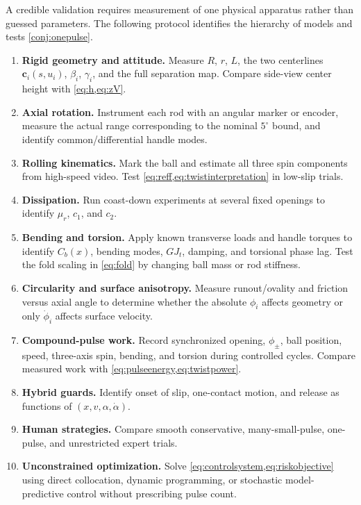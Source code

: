 \documentclass[11pt]{article}
\numberwithin{equation}{section}
\theoremstyle{definition}
\theoremstyle{remark}
\begin{document}
A credible validation requires measurement of one physical apparatus rather than guessed parameters.  The following protocol identifies the hierarchy of models and tests \cref{conj:onepulse}.

\begin{enumerate}[leftmargin=2.25em]
  \item \textbf{Rigid geometry and attitude.} Measure $R$, $r$, $L$, the two centerlines $\bm c_i(s,u_i)$, $\beta_i$, $\gamma_i$, and the full separation map.  Compare side-view center height with \cref{eq:h,eq:zV}.
  \item \textbf{Axial rotation.} Instrument each rod with an angular marker or encoder, measure the actual range corresponding to the nominal $5^\circ$ bound, and identify common/differential handle modes.
  \item \textbf{Rolling kinematics.} Mark the ball and estimate all three spin components from high-speed video.  Test \cref{eq:reff,eq:twistinterpretation} in low-slip trials.
  \item \textbf{Dissipation.} Run coast-down experiments at several fixed openings to identify $\mu_r$, $c_1$, and $c_2$.
  \item \textbf{Bending and torsion.} Apply known transverse loads and handle torques to identify $C_b(x)$, bending modes, $GJ_t$, damping, and torsional phase lag.  Test the fold scaling in \cref{eq:fold} by changing ball mass or rod stiffness.
  \item \textbf{Circularity and surface anisotropy.} Measure runout/ovality and friction versus axial angle to determine whether the absolute $\phi_i$ affects geometry or only $\dot\phi_i$ affects surface velocity.
  \item \textbf{Compound-pulse work.} Record synchronized opening, $\phi_\pm$, ball position, speed, three-axis spin, bending, and torsion during controlled cycles.  Compare measured work with \cref{eq:pulseenergy,eq:twistpower}.
  \item \textbf{Hybrid guards.} Identify onset of slip, one-contact motion, and release as functions of $(x,v,\alpha,\dot\alpha)$.
  \item \textbf{Human strategies.} Compare smooth conservative, many-small-pulse, one-pulse, and unrestricted expert trials.
  \item \textbf{Unconstrained optimization.} Solve \cref{eq:controlsystem,eq:riskobjective} using direct collocation, dynamic programming, or stochastic model-predictive control without prescribing pulse count.
\end{enumerate}
\end{document}
